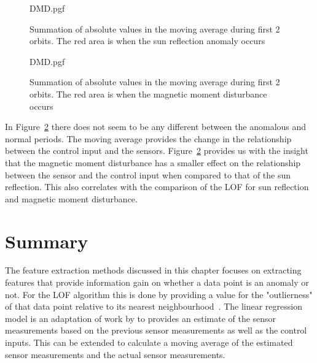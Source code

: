\begin{figure}[!htb]
	\centering
	
	{DMD.pgf}
	
	\caption{Summation of absolute values in the moving average during first 2 orbits. The red area is when the sun reflection anomaly occurs}
	\label{fig:reflectionDMD}
\end{figure}

\begin{figure}[!htb]
	\centering
	
	{DMD.pgf}
	
	\caption{Summation of absolute values in the moving average during first 2 orbits. The red area is when the  magnetic moment disturbance occurs}
	\label{fig:solarPanelDipoleDMD}
\end{figure}

In Figure~\ref{fig:solarPanelDipoleDMD} there does not seem to be any different between the anomalous and normal periods. The moving average provides the change in the relationship between the control input and the sensors. Figure~\ref{fig:solarPanelDipoleDMD} provides us with the insight that the magnetic moment disturbance has a smaller effect on the relationship between the sensor and the control input when compared to that of the sun reflection. This also correlates with the comparison of the LOF for sun reflection and magnetic moment disturbance.

\section{Summary}
The feature extraction methods discussed in this chapter focuses on extracting features that provide information gain on whether a data point is an anomaly or not. For the LOF algorithm this is done by providing a value for the "outlierness" of that data point relative to its nearest neighbourhood~\cite{breunig2000lof}. The linear regression model is an adaptation of work by \cite{DeSilva2020} to provides an estimate of the sensor measurements based on the previous sensor measurements as well as the control inputs. This can be extended to calculate a moving average of the estimated sensor measurements and the actual sensor measurements.